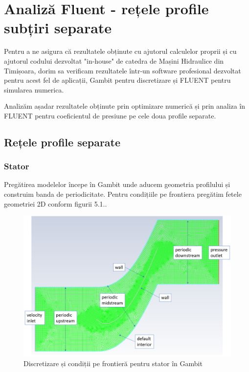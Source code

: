 \chapter{Analiză Fluent - rețele profile subțiri separate}\label{chapter:analiza}

Pentru a ne asigura că rezultatele obținute cu ajutorul calculelor proprii și cu ajutorul codului dezvoltat "in-house" de catedra de Mașini Hidraulice din Timișoara, dorim sa verificam rezultatele într-un software profesional dezvoltat pentru acest fel de aplicații, Gambit pentru discretizare și FLUENT pentru simularea numerica.

Analizăm așadar rezultatele obținute prin optimizare numerică și prin analiza în FLUENT pentru coeficientul de presiune pe cele doua profile separate.

\section{Rețele profile separate}

\subsection{Stator}

Pregătirea modelelor începe în Gambit unde aducem geometria profilului și construim banda de periodicitate. Pentru condițiile pe frontiera pregătim fetele geometriei 2D conform figurii 5.1..

\begin{figure}[h]
	\centering
	\includegraphics[scale=0.5]{figures/mesh-stator-boundary.PNG}
	\caption{Discretizare și condiții pe frontieră pentru stator în Gambit}
	\label{Discretizare și condiții pe frontieră pentru stator în Gambit}
\end{figure}

